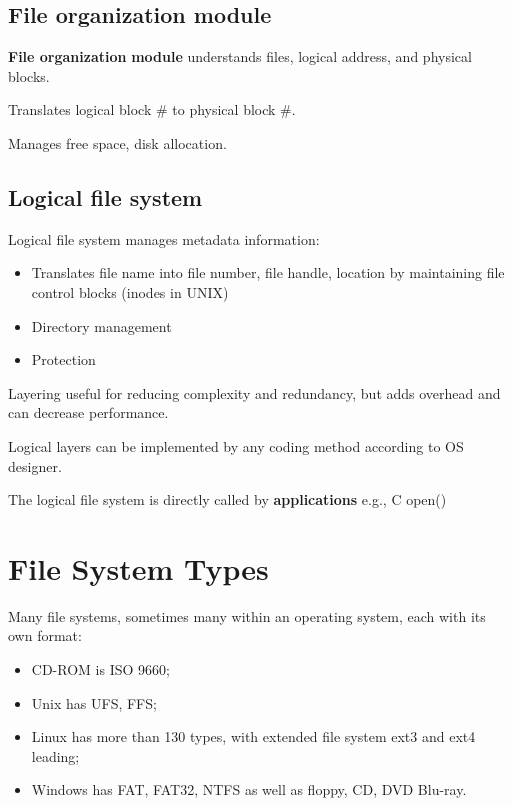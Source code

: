 \subsection{File organization module}

\textbf{File organization} \textbf{module} understands files, logical address, and physical
blocks.

Translates logical block \# to physical block \#.

Manages free space, disk allocation.







\subsection{Logical file system}
Logical file system manages metadata information:

\begin{itemize}
    \item Translates file name into file number, file handle, location by maintaining file control blocks (inodes in UNIX)
    \item Directory management
    \item Protection
\end{itemize}

Layering useful for reducing complexity and
redundancy, but adds overhead and can decrease
performance.

Logical layers can be implemented by any coding
method according to OS designer.


The logical file system is directly called by
\textbf{applications} e.g., C open()    






\section{File System Types}

Many file systems, sometimes many within an operating system, each with its own format:
\begin{itemize}
    \item CD-ROM is ISO 9660;
    \item Unix has UFS, FFS;
    \item Linux has more than 130 types, with extended file system ext3 and ext4 leading;
    \item Windows has FAT, FAT32, NTFS as well as floppy, CD, DVD Blu-ray.
\end{itemize}

